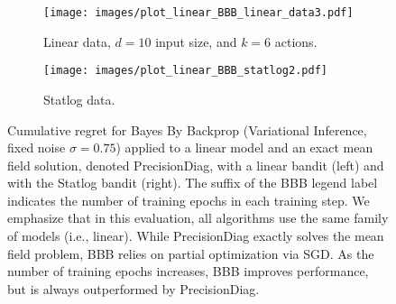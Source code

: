 \documentclass{article} \usepackage{iclr2018_conference,times}
\begin{document}
\begin{figure}[t]
\begin{subfigure}[t]{0.48\textwidth}
  \centering
  \texttt{[image: images/plot\_linear\_BBB\_linear\_data3.pdf]}
  \caption{Linear data, $d = 10$ input size, and $k = 6$ actions.}
  \label{fig:linbbb1}
\end{subfigure}\begin{subfigure}[t]{0.48\textwidth}
  \centering
  \texttt{[image: images/plot\_linear\_BBB\_statlog2.pdf]}
  \caption{Statlog data.}
  \label{fig:linbbb2}
\end{subfigure}\caption{Cumulative regret for Bayes By Backprop (Variational Inference, fixed noise $\sigma = 0.75$) applied to a linear model and an exact mean field solution, denoted PrecisionDiag, with a linear bandit (left) and with the Statlog bandit (right). The suffix of the BBB legend label indicates the number of training epochs in each training step. We emphasize that in this evaluation, all algorithms use the same family of models (i.e., linear). While PrecisionDiag exactly solves the mean field problem, BBB relies on partial optimization via SGD. As the number of training epochs increases, BBB improves performance, but is always outperformed by PrecisionDiag.} \label{fig:linbbb}
\end{figure}
\end{document}
